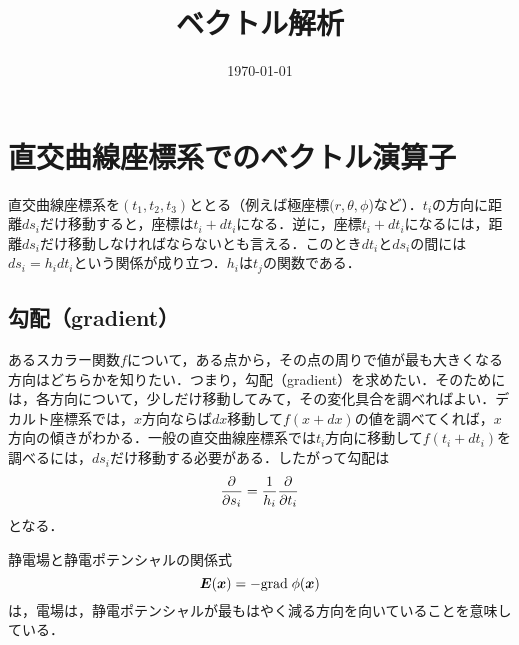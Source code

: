\documentclass[a4paper,10pt,uplatex]{jsarticle}
\renewcommand{\grad}{\mathrm{grad}\;}
\newcommand{\E}{\vb*{E}}
\newcommand{\x}{\vb*{x}}
\begin{document}
\title{ベクトル解析}
\author{}
\date{\today}
\maketitle

\section{直交曲線座標系でのベクトル演算子}
直交曲線座標系を$(t_1, t_2, t_3)$ととる（例えば極座標$(r,\theta,\phi$)など）．$t_i$の方向に距離$ds_i$だけ移動すると，座標は$t_i+dt_i$になる．逆に，座標$t_i + dt_i$になるには，距離$ds_i$だけ移動しなければならないとも言える．このとき$dt_i$と$ds_i$の間には$ds_i = h_i dt_i$という関係が成り立つ．$h_i$は$t_j$の関数である．

\subsection{勾配（gradient）}
あるスカラー関数$f$について，ある点から，その点の周りで値が最も大きくなる方向はどちらかを知りたい．つまり，勾配（gradient）を求めたい．そのためには，各方向について，少しだけ移動してみて，その変化具合を調べればよい．デカルト座標系では，$x$方向ならば$dx$移動して$f(x+dx)$の値を調べてくれば，$x$方向の傾きがわかる．一般の直交曲線座標系では$t_i$方向に移動して$f(t_i+dt_i)$を調べるには，$ds_i$だけ移動する必要がある．したがって勾配は
\begin{equation}
    \pdv{s_i} = \frac{1}{h_i}\pdv{t_i}
\end{equation}
となる．

静電場と静電ポテンシャルの関係式
\begin{equation}
    \E(\x) = -\grad \phi(\x)
\end{equation}
は，電場は，静電ポテンシャルが最もはやく減る方向を向いていることを意味している．
\end{document}
